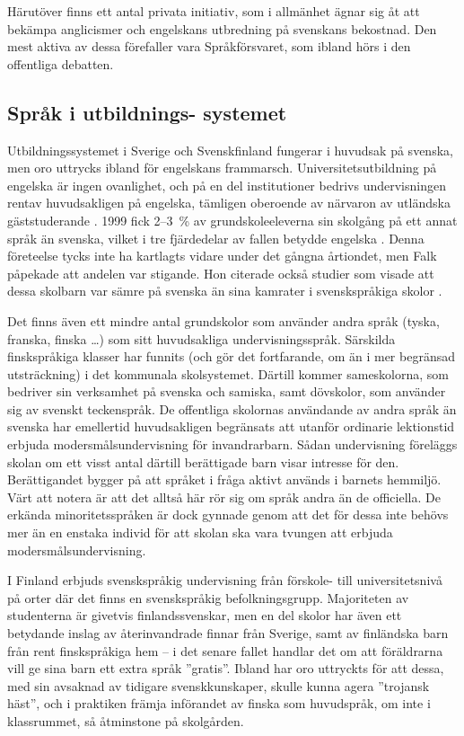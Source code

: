 \begin{multicols}{2}
Härutöver finns ett antal privata initiativ, som i allmänhet ägnar sig
åt att bekämpa anglicismer och engelskans utbredning på svenskans
bekostnad. Den mest aktiva av dessa förefaller vara Språkförsvaret,
som ibland hörs i den offentliga debatten.

\subsection[Språk i utbildningssystemet]{Språk i utbildnings- systemet}

Utbildningssystemet i Sverige och Svenskfinland fungerar i huvudsak på
svenska, men oro uttrycks ibland för engelskans
frammarsch. Universitetsutbildning på engelska är ingen ovanlighet,
och på en del institutioner bedrivs undervisningen rentav
huvudsakligen på engelska, tämligen oberoende av närvaron av utländska
gäststuderande \cite[25, 29f]{falk2001}. 1999 fick 2--3~\% av
grundskoleeleverna sin skolgång på ett annat språk än svenska, vilket
i tre fjärdedelar av fallen betydde engelska \cite[18f]{falk2001}. Denna
företeelse tycks inte ha kartlagts vidare under det gångna årtiondet,
men Falk påpekade att andelen var stigande. Hon citerade också studier
som visade att dessa skolbarn var sämre på svenska än sina kamrater i
svenskspråkiga skolor \cite[19]{falk2001}.

Det finns även ett mindre antal grundskolor som använder andra språk
(tyska, franska, finska \ldots) som sitt huvudsakliga
undervisningsspråk. Särskilda finskspråkiga klasser har funnits (och
gör det fortfarande, om än i mer begränsad utsträckning) i det
kommunala skolsystemet. Därtill kommer sameskolorna, som bedriver sin
verksamhet på svenska och samiska, samt dövskolor, som använder sig av
svenskt teckenspråk. De offentliga skolornas användande av andra språk
än svenska har emellertid huvudsakligen begränsats att utanför
ordinarie lektionstid erbjuda modersmålsundervisning för
invandrarbarn. Sådan undervisning föreläggs skolan om ett visst antal
därtill berättigade barn visar intresse för den. Berättigandet bygger
på att språket i fråga aktivt används i barnets hemmiljö. Värt att
notera är att det alltså här rör sig om språk andra än de
officiella. De erkända minoritetsspråken är dock gynnade genom att det
för dessa inte behövs mer än en enstaka individ för att skolan ska
vara tvungen att erbjuda modersmålsundervisning.

I Finland erbjuds svenskspråkig undervisning från förskole- till
universitetsnivå på orter där det finns en svenskspråkig
befolkningsgrupp. Majoriteten av studenterna är givetvis
finlandssvenskar, men en del skolor har även ett betydande inslag av
återinvandrade finnar från Sverige, samt av finländska barn från rent
finskspråkiga hem -- i det senare fallet handlar det om att föräldrarna
vill ge sina barn ett extra språk ''gratis''. Ibland har oro uttryckts
för att dessa, med sin avsaknad av tidigare svenskkunskaper, skulle
kunna agera ''trojansk häst'', och i praktiken främja införandet av
finska som huvudspråk, om inte i klassrummet, så åtminstone på
skolgården.


\end{multicols}
